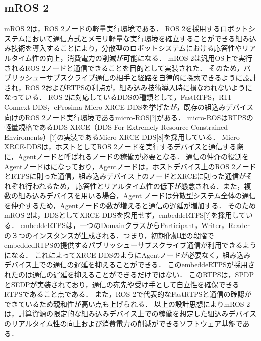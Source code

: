 \subsection{mROS 2}
mROS 2は，ROS 2ノードの軽量実行環境である．
ROS 2を採用するロボットシステムにおいて通信方式とメモリ軽量な実行環境を確立することができる組み込み技術を導入することにより，分散型のロボットシステムにおける応答性やリアルタイム性の向上，消費電力の削減が可能になる．
mROS 2は汎用OS上で実行されるROS 2ノードと通信できることを目的として実装された．
そのため，パブリッシューサブスクライブ通信の相手と経路を自律的に探索できるように設計され，ROS 2およびRTPSの利点が，組み込み技術導入時に損なわれないようになっている．
ROS 2に対応しているDDSの種類として，FastRTPS，RTI Connext DDS，eProsima Micro XRCE-DDSを挙げたが，既存の組込みデバイス向けのROS 2ノード実行環境であるmicro-ROS[?]がある．
micro-ROSはRTPSの軽量規格であるDDS-XRCE（DDS For Extremely Resource Constrained Enviroments）[?]の実装であるMicro XRCE-DDS[8]を採用している．
Micro　XRCE-DDSは，ホストとしてROS 2ノードを実行するデバイスと通信する際に，Agentノードと呼ばれるノードの稼働が必要となる．
通信の仲介の役割をAgentノードはになっており，Agentノードは，ホストデバイス上のROS 2ノードとRTPSに則った通信，組み込みデバイス上のノードとXRCEに則った通信がそれぞれ行われるため，
応答性とリアルタイム性の低下が懸念される．また，複数の組み込みデバイスを用いる場合，Agent ノードは分散型システム全体の通信を仲介するため，Agentノードの数が増えると通信の遅延が増加する．
そのためmROS 2は，DDSとしてXRCE-DDSを採用せず，embeddeRTPS[?]を採用している．
embeddeRTPSは，一つのDomainクラスからParticipant，Writer，Readerの３つのインスタンスが生成される．つまり，初期化処理の段階でembeddedRTPSの提供するパブリッシューサブスクライブ通信が利用できるようになる．
これによってXRCE-DDSのようにAgentノードが必要なく，組み込みデバイス上での通信の遅延を抑えることができる．
このembeddeRTPSが採用されたのは通信の遅延を抑えることができるだけではない．
このRTPSは，SPDPとSEDPが実装されており，通信の宛先や受け手として自立性を確保できるRTPSであること点である．
また，ROS 2で代表的なFastRTPSと通信の確認ができているため親和性が高い点も上げられる．
以上の設計思想によりmROS 2は，計算資源の限定的な組み込みデバイス上での稼働を想定した組込みデバイスのリアルタイム性の向上および消費電力の削減ができるソフトウェア基盤である．
